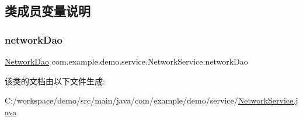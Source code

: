 \subsection{类成员变量说明}
\mbox{\label{classcom_1_1example_1_1demo_1_1service_1_1_network_service_ad2a9991e6c106b0be28b3db5ade2faac}} 
\subsubsection{\texorpdfstring{network\+Dao}{networkDao}}
{\footnotesize\ttfamily \mbox{\hyperlink{interfacecom_1_1example_1_1demo_1_1dao_1_1_network_dao}{Network\+Dao}} com.\+example.\+demo.\+service.\+Network\+Service.\+network\+Dao\hspace{0.3cm}{\ttfamily [package]}}



该类的文档由以下文件生成\+:\begin{DoxyCompactItemize}
\item 
C\+:/workspace/demo/src/main/java/com/example/demo/service/\mbox{\hyperlink{_network_service_8java}{Network\+Service.\+java}}\end{DoxyCompactItemize}
